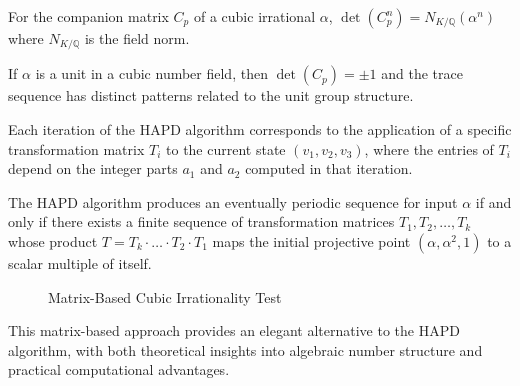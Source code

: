 \begin{theorem}
For the companion matrix $C_p$ of a cubic irrational $\alpha$, $\det(C_p^n) = N_{K/\mathbb{Q}}(\alpha^n)$ where $N_{K/\mathbb{Q}}$ is the field norm.
\end{theorem}

\begin{proposition}
If $\alpha$ is a unit in a cubic number field, then $\det(C_p) = \pm 1$ and the trace sequence has distinct patterns related to the unit group structure.
\end{proposition}

\begin{proposition}\label{prop:matrix_hapd}
Each iteration of the HAPD algorithm corresponds to the application of a specific transformation matrix $T_i$ to the current state $(v_1, v_2, v_3)$, where the entries of $T_i$ depend on the integer parts $a_1$ and $a_2$ computed in that iteration.
\end{proposition}

\begin{theorem}\label{thm:matrix_periodicity}
The HAPD algorithm produces an eventually periodic sequence for input $\alpha$ if and only if there exists a finite sequence of transformation matrices $T_1, T_2, \ldots, T_k$ whose product $T = T_k \cdot \ldots \cdot T_2 \cdot T_1$ maps the initial projective point $(\alpha, \alpha^2, 1)$ to a scalar multiple of itself.
\end{theorem}

\begin{figure}[htbp]
\centering
{}
\caption{Matrix-Based Cubic Irrationality Test}
\label{alg:matrix_cubic}
\end{figure}

This matrix-based approach provides an elegant alternative to the HAPD algorithm, with both theoretical insights into algebraic number structure and practical computational advantages.
